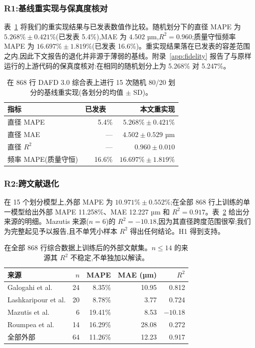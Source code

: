 \documentclass[11pt,a4paper]{ctexart}
\begin{document}
\subsubsection{R1:基线重实现与保真度核对}
\label{sec:r1}

表~\ref{tab:repro} 将我们的重实现结果与已发表数值作比较。随机划分下的直径 MAPE 为 $5.268\% \pm 0.421\%$(已发表 5.4\%),MAE 为 $4.502$ µm,$R^2=0.960$;质量守恒频率 MAPE 为 $16.697\% \pm 1.819\%$(已发表 16.6\%)。重实现结果落在已发表的容差范围之内,因此下文报告的退化并非源于薄弱的基线。附录~\ref{app:fidelity} 报告了与原样运行的上游代码的保真度核对:在相同的随机划分上为 5.268\% 对 5.247\%。

\begin{table}[t]
\centering\small
\caption{在 868 行 DAFD 3.0 综合表上进行 15 次随机 80/20 划分的基线重实现(各划分的均值 $\pm$ SD)。}
\label{tab:repro}
\begin{tabular}{lrr}
\toprule
指标 & 已发表 ~\cite{lashkaripour2024} & 本文重实现 \\
\midrule
直径 MAPE & 5.4\% & $5.268\% \pm 0.421\%$ \\
直径 MAE & — & $4.502 \pm 0.529$ µm \\
直径 $R^2$ & — & $0.960 \pm 0.010$ \\
频率 MAPE(质量守恒) & 16.6\% & $16.697\% \pm 1.819\%$ \\
\bottomrule
\end{tabular}
\end{table}

\subsubsection{R2:跨文献退化}
\label{sec:r2}

在 15 个划分模型上,外部 MAPE 为 $10.971\% \pm 0.552\%$;在全部 868 行上训练的单一模型给出外部 MAPE 11.258\%、MAE 12.227 µm 和 $R^2=0.917$。表~\ref{tab:sources} 给出分来源的明细。Mazutis 来源($n=6$)的 $R^2=-10.18$,因为其直径跨度范围很窄;我们为完整起见予以报告,且不单凭小样本 $R^2$ 得出任何结论。H1 得到支持。

\begin{table}[t]
\centering\small
\caption{在全部 868 行综合数据上训练后的外部文献集。$n\le 14$ 的来源其 $R^2$ 不稳定,不单独加以解读。}
\label{tab:sources}
\begin{tabular}{lrrrr}
\toprule
来源 & $n$ & MAPE & MAE (µm) & $R^2$ \\
\midrule
Galogahi et al. & 24 & 8.35\% & 10.95 & 0.812 \\
Lashkaripour et al. & 20 & 8.78\% & 3.77 & 0.724 \\
Mazutis et al. & 6 & 19.41\% & 8.53 & $-10.18$ \\
Roumpea et al. & 14 & 16.29\% & 28.08 & 0.272 \\
全部外部 & 64 & 11.26\% & 12.23 & 0.917 \\
\bottomrule
\end{tabular}
\end{table}
\end{document}
